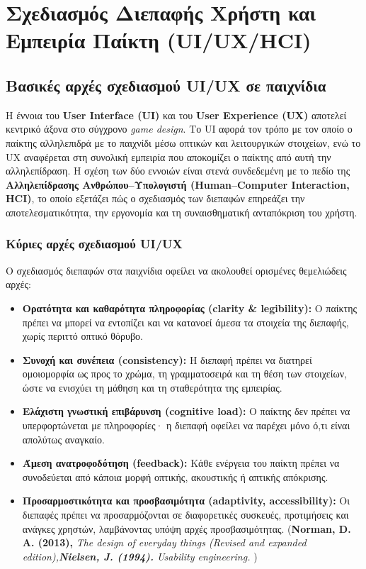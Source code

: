 \chapter{Σχεδιασμός Διεπαφής Χρήστη και Εμπειρία Παίκτη (UI/UX/HCI)}
\section{Βασικές αρχές σχεδιασμού UI/UX σε παιχνίδια}
Η έννοια του \textbf{User Interface (UI)} και του \textbf{User Experience (UX)} αποτελεί κεντρικό άξονα στο σύγχρονο \textit{game design}. Το UI αφορά τον τρόπο με τον οποίο ο παίκτης αλληλεπιδρά με το παιχνίδι μέσω οπτικών και λειτουργικών στοιχείων, ενώ το UX αναφέρεται στη συνολική εμπειρία που αποκομίζει ο παίκτης από αυτή την αλληλεπίδραση. Η σχέση των δύο εννοιών είναι στενά συνδεδεμένη με το πεδίο της \textbf{Αλληλεπίδρασης Ανθρώπου–Υπολογιστή (Human–Computer Interaction, HCI)}, το οποίο εξετάζει πώς ο σχεδιασμός των διεπαφών επηρεάζει την αποτελεσματικότητα, την εργονομία και τη συναισθηματική ανταπόκριση του χρήστη.

\subsection*{Κύριες αρχές σχεδιασμού UI/UX}
Ο σχεδιασμός διεπαφών στα παιχνίδια οφείλει να ακολουθεί ορισμένες θεμελιώδεις αρχές:

\begin{itemize}
  \item \textbf{Ορατότητα και καθαρότητα πληροφορίας (clarity \& legibility):} Ο παίκτης πρέπει να μπορεί να εντοπίζει και να κατανοεί άμεσα τα στοιχεία της διεπαφής, χωρίς περιττό οπτικό θόρυβο.
  \item \textbf{Συνοχή και συνέπεια (consistency):} Η διεπαφή πρέπει να διατηρεί ομοιομορφία ως προς το χρώμα, τη γραμματοσειρά και τη θέση των στοιχείων, ώστε να ενισχύει τη μάθηση και τη σταθερότητα της εμπειρίας.
  \item \textbf{Ελάχιστη γνωστική επιβάρυνση (cognitive load):} Ο παίκτης δεν πρέπει να υπερφορτώνεται με πληροφορίες· η διεπαφή οφείλει να παρέχει μόνο ό,τι είναι απολύτως αναγκαίο.
  \item \textbf{Άμεση ανατροφοδότηση (feedback):} Κάθε ενέργεια του παίκτη πρέπει να συνοδεύεται από κάποια μορφή οπτικής, ακουστικής ή απτικής απόκρισης.
  \item \textbf{Προσαρμοστικότητα και προσβασιμότητα (adaptivity, accessibility):} Οι διεπαφές πρέπει να προσαρμόζονται σε διαφορετικές συσκευές, προτιμήσεις και ανάγκες χρηστών, λαμβάνοντας υπόψη αρχές προσβασιμότητας. (\textbf{Norman, D. A. (2013),} \textit{The design of everyday things (Revised and expanded edition),\textbf{Nielsen, J. (1994).} \textit{Usability engineering.} } )
\end{itemize}

